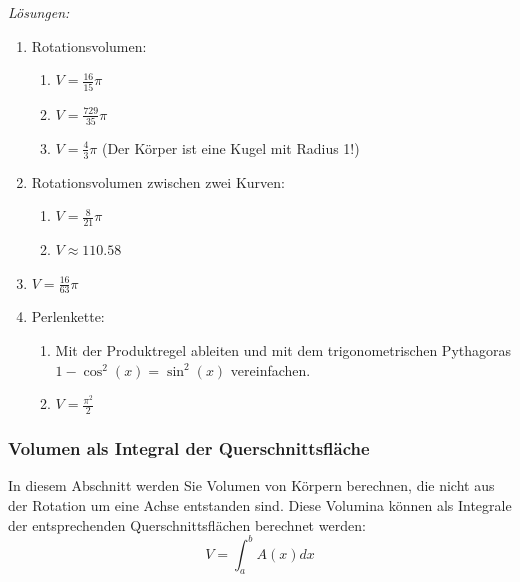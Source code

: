 \clearpage
\emph{Lösungen:}
\begin{enumerate}
	\item Rotationsvolumen:
	      \begin{enumerate}
		      \item \(V=\frac{16}{15}\pi\)
		      \item \(V=\frac{729}{35}\pi\)
		      \item \(V=\frac{4}{3}\pi\) (Der Körper ist eine Kugel mit Radius 1!)
	      \end{enumerate}
	\item Rotationsvolumen zwischen zwei Kurven:
	      \begin{enumerate}
		      \item \(V=\frac{8}{21}\pi\)
		      \item \(V\approx 110.58\)
	      \end{enumerate}
	\item \(V=\frac{16}{63}\pi\)
	\item Perlenkette:
	      \begin{enumerate}
		      \item Mit der Produktregel ableiten und mit dem trigonometrischen Pythagoras \(1-\cos^2(x)=\sin^2(x)\) vereinfachen.
		      \item \(V=\frac{\pi^2}{2}\)
	      \end{enumerate}

\end{enumerate}

\clearpage
\subsubsection*{Volumen als Integral der Querschnittsfläche}
In diesem Abschnitt werden Sie Volumen von Körpern berechnen, die nicht aus der Rotation um eine Achse entstanden sind. Diese Volumina können als Integrale der entsprechenden Querschnittsflächen berechnet werden:
\[ V= \int_{a}^{b} A(x) dx\]

